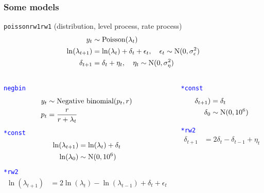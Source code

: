 \documentclass[usenames,dvipsnames]{beamer}
\begin{document}
\begin{frame}
\frametitle{Some models}
\texttt{poisson\textunderscore rw1\textunderscore rw1} (distribution, level process, rate process)
 \begin{align*}
 y_t &\sim \textnormal{Poisson}(\lambda_t) \\
 \ln(\lambda_{t+1}) &= \ln(\lambda_t) + \delta_t + \epsilon_t, \quad \epsilon_t \sim \textnormal{N}(0, \sigma_{\epsilon}^2) \\
  \delta_{t+1} &= \delta_t + \eta_t, \quad \eta_t \sim \textnormal{N}(0, \sigma_{\eta}^2)
\end{align*}
\small
\begin{columns}
\begin{column}{0.5\textwidth}
\textcolor{blue}{\texttt{negbin\textunderscore *\textunderscore *}}
 \begin{align*}
 y_t &\sim \textnormal{Negative binomial}(p_t,r) \\
 p_t &= \frac{r}{r+\lambda_t}
 \end{align*}
\textcolor{blue}{\texttt{*\textunderscore const\textunderscore *}}
 \begin{align*}
\ln(\lambda_{t+1}) &= \ln(\lambda_t) + \delta_t \\
\ln(\lambda_{0}) &\sim \textnormal{N}(0, 10^6) 
 \end{align*}
 \textcolor{blue}{\texttt{*\textunderscore rw2\textunderscore *}}
 \begin{align*}
\ln(\lambda_{t+1}) &= 2 \ln(\lambda_t) - \ln(\lambda_{t-1}) + \delta_t + \epsilon_t\\
 \end{align*}
\end{column}
\begin{column}{0.5\textwidth}
\textcolor{blue}{\texttt{*\textunderscore *\textunderscore const}}
 \begin{align*}
\delta_{t+1}) &= \delta_t \\
\delta_{0} &\sim \textnormal{N}(0, 10^6) 
 \end{align*}
 
\textcolor{blue}{\texttt{*\textunderscore *\textunderscore rw2}}
 \begin{align*}
\delta_{t+1} &= 2 \delta_t - \delta_{t-1} + \eta_t
 \end{align*}

\end{column}
\end{columns}

\end{frame}
\end{document}
